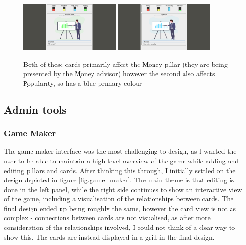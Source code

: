 \begin{figure}[!h]
	\centering
	\includegraphics[width=0.45\textwidth]{./images/design/ecman_green.png}
	\includegraphics[width=0.45\textwidth]{./images/design/ecman_blue.png}
	\caption{Both of these cards primarily affect the \c{Money} pillar (they are being presented by the \c{Money} advisor) however the second also affects \c{Popularity}, so has a blue primary colour}
	\label{fig:colour_comp}
\end{figure}

\subsection{Admin tools}

\subsubsection{Game Maker}
The game maker interface was the most challenging to design, as I wanted the user to be able to maintain a high-level overview of the game while adding and editing pillars and cards. 
After thinking this through, I initially settled on the design depicted in figure \ref{fig:game_maker}. The main theme is that editing is done in the left panel, while the right side continues to show an interactive view of the game, including a visualisation of the relationships between cards.
The final design ended up being roughly the same, however the card view is not as complex - connections between cards are not visualised, as after more consideration of the relationships involved, I could not think of a clear way to show this.
The cards are instead displayed in a grid in the final design.

